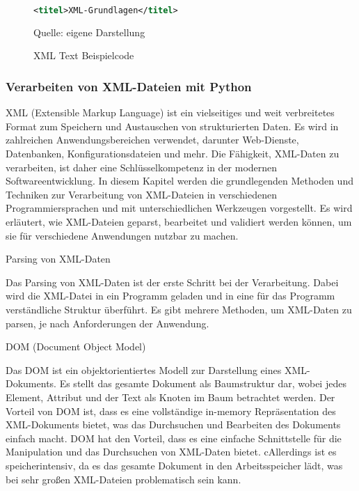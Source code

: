 \begin{figure}[H]
\centering
\begin{minipage}{0.95\textwidth}
\begin{lstlisting}[language=XML]
<titel>XML-Grundlagen</titel>
\end{lstlisting}
\end{minipage}
\caption{XML Text Beispielcode}
\label{fig:XML Text Beispielcode}
    {Quelle: eigene Darstellung}
\end{figure}

\subsubsection{Verarbeiten von XML-Dateien mit Python}
XML (Extensible Markup Language) ist ein vielseitiges und weit verbreitetes Format zum Speichern und Austauschen von strukturierten Daten.
Es wird in zahlreichen Anwendungsbereichen verwendet, darunter Web-Dienste, Datenbanken, Konfigurationsdateien und mehr.
Die Fähigkeit, XML-Daten zu verarbeiten, ist daher eine Schlüsselkompetenz in der modernen Softwareentwicklung.
In diesem Kapitel werden die grundlegenden Methoden und Techniken zur Verarbeitung von XML-Dateien in verschiedenen Programmiersprachen und mit unterschiedlichen Werkzeugen vorgestellt.
Es wird erläutert, wie XML-Dateien geparst, bearbeitet und validiert werden können, um sie für verschiedene Anwendungen nutzbar zu machen.

Parsing von XML-Daten

Das Parsing von XML-Daten ist der erste Schritt bei der Verarbeitung.
Dabei wird die XML-Datei in ein Programm geladen und in eine für das Programm verständliche Struktur überführt.
Es gibt mehrere Methoden, um XML-Daten zu parsen, je nach Anforderungen der Anwendung.

DOM (Document Object Model)

Das DOM ist ein objektorientiertes Modell zur Darstellung eines XML-Dokuments.
Es stellt das gesamte Dokument als Baumstruktur dar, wobei jedes Element, Attribut und der Text als Knoten im Baum betrachtet werden.
Der Vorteil von DOM ist, dass es eine vollständige in-memory Repräsentation des XML-Dokuments bietet, was das Durchsuchen und Bearbeiten des Dokuments einfach macht.
DOM hat den Vorteil, dass es eine einfache Schnittstelle für die Manipulation und das Durchsuchen von XML-Daten bietet.
cAllerdings ist es speicherintensiv, da es das gesamte Dokument in den Arbeitsspeicher lädt, was bei sehr großen XML-Dateien problematisch sein kann.

